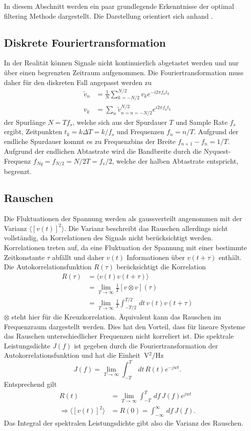 In diesem Abschnitt werden ein paar grundlegende Erkenntnisse der optimal filtering Methode dargestellt.
Die Darstellung orientiert sich anhand \cite{Golwala2000, Enss2005}.

\subsection{Diskrete Fouriertransformation}
In der Realität können Signale nicht kontinuierlich abgetastet werden und nur über einen begrenzten Zeitraum aufgenommen.
Die Fouriertransformation muss daher für den diskreten Fall angepasst werden zu
\begin{align*}
\widetilde{v}_n &= \frac{1}{N}\sum_{k=-N/2}^{N/2} v_k e^{-i2\pi f_n t_k} \\
v_k &= \sum_n \widetilde{v}_{n=n=-N/2}^{N/2} e^{i2\pi f_n t_k}
\end{align*}
der Spurlänge $N=Tf_s$, welche sich aus der Spurdauer $T$ und Sample Rate $f_s$ ergibt, Zeitpunkten $t_k = k\Delta T = k/f_s$ und Frequenzen $f_n = n/T$.
Aufgrund der endliche Spurdauer kommt es zu Frequenzbins der Breite $f_{n+1}-f_n=1/T$.
Aufgrund der endlichen Abtastrate wird die Bandbreite durch die Nyquest-Frequenz $f_{Nq}=f_{N/2}=N/2T=f_s/2$, welche der halben Abtastrate entspricht, begrenzt.

\subsection{Rauschen}
Die Fluktuationen der Spannung werden als gaussverteilt angenommen mit der Varianz $\langle\left[v(t)\right]^2\rangle$.
Die Varianz beschreibt das Rauschen allerdings nicht vollständig, da Korrelationen des Signals nicht berücksichtigt werden.
Korrelationen treten auf, da eine Fluktuation der Spannung mit einer bestimmte Zeitkonstante $\tau$ abfällt und daher $v(t)$ Informationen über $v(t+\tau)$ enthält.
Die Autokorrelationsfunktion $R(\tau)$ berücksichtigt die Korrelation
\begin{align*}
R(\tau) &= \langle v(t)v(t+\tau)\rangle \\
&= \lim_{T\rightarrow \infty}\frac{1}{T}[v\otimes v](\tau) \\
&= \lim_{T\rightarrow \infty}\frac{1}{T}\int_{-T/2}^{T/2}\,dt\, v(t)v(t+\tau)
\end{align*}
$\otimes$ steht hier für die Kreuzkorrelation.
Äquivalent kann das Rauschen im Frequenzraum dargestellt werden.
Dies hat den Vorteil, dass für lineare Systeme das Rauschen unterschiedlicher Frequenzen nicht korreliert ist.
Die spektrale Leistungsdichte $J(f)$ ist gegeben durch die Fouriertransformation der Autokorrelationsfunktion und hat die Einheit $\SI{}{\volt^2\per\hertz}$
\begin{equation}
J(f) = \lim_{T\rightarrow \infty}\int_{-T}^{T}\, dt\, R(t) e^{-jwt}.
\end{equation}
Entsprechend gilt 
\begin{align*}
R(t) &= \lim_{T\rightarrow \infty}\int_{-T}^{T}\,df\, J(f) e^{jwt} \\
\Rightarrow \langle\left[v(t)\right]^2\rangle &= R(0) = \int_{-\infty}^{\infty}\,df\, J(f).
\end{align*}
Das Integral der spektralen Leistungsdichte gibt also die Varianz des Rauschen. 

